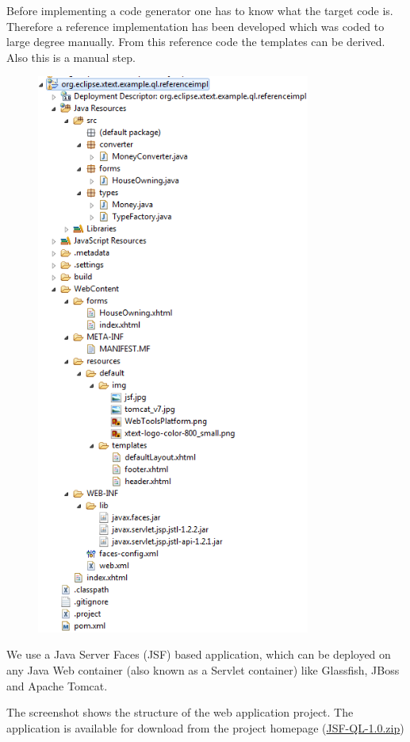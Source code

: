 Before implementing a code generator one has to know what the target code is. Therefore a reference implementation has been
developed which was coded to large degree manually. From this reference code the templates can be derived. Also this is a
manual step.
\begin{figure}
 \includegraphics[width=9cm]{./images/chapter02/referenceimpl_projecttree.png}
\end{figure}
We use a Java Server Faces (JSF) based application, which can be deployed on any
Java Web container (also known as a Servlet container) like Glassfish, JBoss and Apache Tomcat.

The screenshot shows the structure of the web application project. The application is available for download from the project 
homepage (\href{http://lwc13-xtext.eclipselabs.org.codespot.com/files/JSF-QL-1.0.zip}{JSF-QL-1.0.zip})
 
